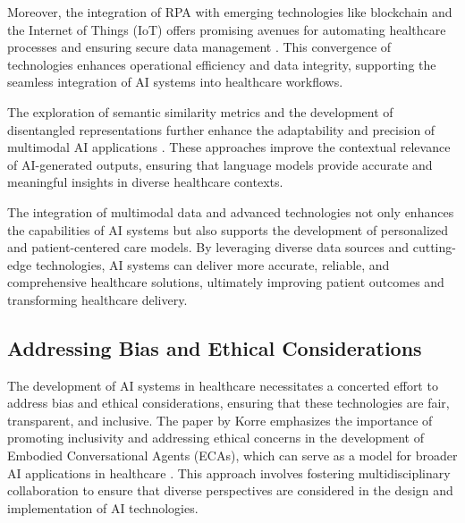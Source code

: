 Moreover, the integration of RPA with emerging technologies like blockchain and the Internet of Things (IoT) offers promising avenues for automating healthcare processes and ensuring secure data management \cite{pandy2024advancementsroboticsprocessautomation}. This convergence of technologies enhances operational efficiency and data integrity, supporting the seamless integration of AI systems into healthcare workflows.



The exploration of semantic similarity metrics and the development of disentangled representations further enhance the adaptability and precision of multimodal AI applications \cite{yamshchikov2020styletransferparaphraselookingsensible}. These approaches improve the contextual relevance of AI-generated outputs, ensuring that language models provide accurate and meaningful insights in diverse healthcare contexts.



The integration of multimodal data and advanced technologies not only enhances the capabilities of AI systems but also supports the development of personalized and patient-centered care models. By leveraging diverse data sources and cutting-edge technologies, AI systems can deliver more accurate, reliable, and comprehensive healthcare solutions, ultimately improving patient outcomes and transforming healthcare delivery.



\subsection{Addressing Bias and Ethical Considerations} \label{subsec:Addressing Bias and Ethical Considerations}



The development of AI systems in healthcare necessitates a concerted effort to address bias and ethical considerations, ensuring that these technologies are fair, transparent, and inclusive. The paper by Korre emphasizes the importance of promoting inclusivity and addressing ethical concerns in the development of Embodied Conversational Agents (ECAs), which can serve as a model for broader AI applications in healthcare \cite{korre2023takesvillagemultidisciplinaritycollaboration}. This approach involves fostering multidisciplinary collaboration to ensure that diverse perspectives are considered in the design and implementation of AI technologies.




